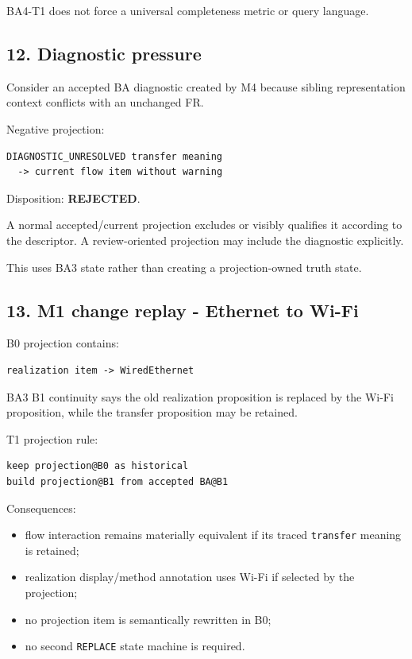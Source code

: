 \documentclass[11pt,a4paper]{article}
\providecommand{\tightlist}{\setlength{\itemsep}{0pt}\setlength{\parskip}{0pt}}
\begin{document}
BA4-T1 does not force a universal completeness metric or query language.

\subsection{12. Diagnostic pressure}\label{12-diagnostic-pressure}

Consider an accepted BA diagnostic created by M4 because sibling representation context conflicts with an unchanged FR.

Negative projection:

\begin{verbatim}
DIAGNOSTIC_UNRESOLVED transfer meaning
  -> current flow item without warning
\end{verbatim}

Disposition: \textbf{REJECTED}.

A normal accepted/current projection excludes or visibly qualifies it according to the descriptor. A review-oriented projection may include the diagnostic explicitly.

This uses BA3 state rather than creating a projection-owned truth state.

\subsection{13. M1 change replay - Ethernet to Wi-Fi}\label{13-m1-change-replay---ethernet-to-wi-fi}

B0 projection contains:

\begin{verbatim}
realization item -> WiredEthernet
\end{verbatim}

BA3 B1 continuity says the old realization proposition is replaced by the Wi-Fi proposition, while the transfer proposition may be retained.

T1 projection rule:

\begin{verbatim}
keep projection@B0 as historical
build projection@B1 from accepted BA@B1
\end{verbatim}

Consequences:

\begin{itemize}
\tightlist
\item
  flow interaction remains materially equivalent if its traced \texttt{transfer} meaning is retained;
\item
  realization display/method annotation uses Wi-Fi if selected by the projection;
\item
  no projection item is semantically rewritten in B0;
\item
  no second \texttt{REPLACE} state machine is required.
\end{itemize}
\end{document}

